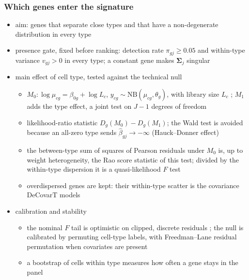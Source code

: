 \documentclass[pdflatex, sn-nature]{sn-jnl}
\theoremstyle{thmstyleone}%
\theoremstyle{thmstyletwo}%
\theoremstyle{thmstylethree}%
\begin{document}
\subsubsection{Which genes enter the signature}
\label{sec:feature-selection}

\begin{itemize}
  \item aim: genes that separate close types and that have a non-degenerate distribution in every type
  \item presence gate, fixed before ranking: detection rate \(\pi_{gj}\ge0.05\) and within-type variance
        \(v_{gj}>0\) in every type; a constant gene makes \(\boldsymbol{\Sigma}_{j}\) singular
  \item main effect of cell type, tested against the technical null
  \begin{itemize}
    \item \(M_{0}:\log\mu_{cg}=\beta_{0g}+\log L_{c}\), \(y_{cg}\sim\mathrm{NB}(\mu_{cg},\theta_{g})\), with library size
          \(L_{c}\) \cite{hafemeisterNormalizationVarianceStabilization2019}; \(M_{1}\) adds the type effect, a joint
          test on \(J-1\) degrees of freedom \cite{agrestiFoundationsLinearGeneralized2015}
    \item likelihood-ratio statistic \(D_{g}(M_{0})-D_{g}(M_{1})\); the Wald test is avoided because an all-zero
          type sends \(\hat\beta_{gj}\to-\infty\) (Hauck--Donner effect) \cite{yeeHauckDonnerEffectWald2022}
    \item the between-type sum of squares of Pearson residuals under \(M_{0}\) is, up to weight heterogeneity,
          the Rao score statistic of this test; divided by the within-type dispersion it is a quasi-likelihood
          \(F\) test \cite{lundDetectingDifferentialExpression2012,glmGamPoi2020}
    \item overdispersed genes are kept: their within-type scatter is the covariance DeCovarT models
  \end{itemize}
  \item calibration and stability
  \begin{itemize}
    \item the nominal \(F\) tail is optimistic on clipped, discrete residuals
          \cite{lauseAnalyticPearsonResiduals2021}; the null is calibrated by permuting cell-type labels,
          with Freedman--Lane residual permutation when covariates are present
          \cite{freedmanNonstochasticInterpretation1983}
    \item a bootstrap of cells within type measures how often a gene stays in the panel

\end{itemize}
\end{itemize}
\end{document}
